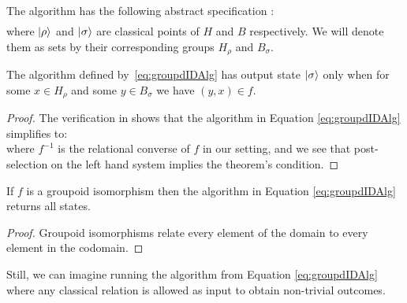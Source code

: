 The algorithm has the following abstract specification :
\begin{align}
\label{eq:groupdIDAlg}

\end{align}
where $| \rho \rangle$ and $| \sigma \rangle$ are classical points of $H$ and $B$ respectively. We will denote them as sets by their corresponding groups $H_\rho$ and $B_\sigma$.

\begin{theorem}
The algorithm defined by~\eqref{eq:groupdIDAlg} has output state $| \sigma \rangle$ only when for some $x\in H_\rho$ and some $y\in B_\sigma$ we have $(y,x)\in f$.
\end{theorem}
\begin{proof}
The verification in  shows that the algorithm in Equation \ref{eq:groupdIDAlg} simplifies to:
\begin{equation}

\end{equation}
where $f^{-1}$ is the relational converse of $f$ in our setting, and we see that post-selection on the left hand system implies the theorem's condition.
\end{proof}

\begin{theorem}
If $f$ is a groupoid isomorphism then the algorithm in Equation \ref{eq:groupdIDAlg} returns all states.
\end{theorem}
\begin{proof}
Groupoid isomorphisms relate every element of the domain to every element in the codomain.
\end{proof}

Still, we can imagine running the algorithm from Equation \ref{eq:groupdIDAlg} where any classical relation is allowed as input to obtain non-trivial outcomes.

